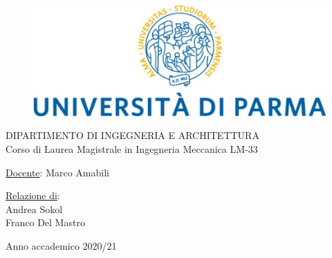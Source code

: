 
\begin{center}
    \begin{figure}[h]
        \centering
        \includegraphics[scale=0.7]{Immagini/logo.jpg}
      
    \end{figure}
    \vspace{0.5cm}
    \centering
    DIPARTIMENTO DI INGEGNERIA E ARCHITETTURA
\\
\vspace{0.5cm}
\centering
Corso di Laurea Magistrale in Ingegneria Meccanica LM-33\\
\vspace{0.5cm}


\end{center}
\underline{Docente}: Marco Amabili
\begin{flushright}
\underline{Relazione di}: \\
\vspace{0.1cm}
Andrea Sokol\\
Franco Del Mastro
\end{flushright}
\vspace{1cm}
\begin{center}
   Anno accademico 2020/21 
\end{center}
